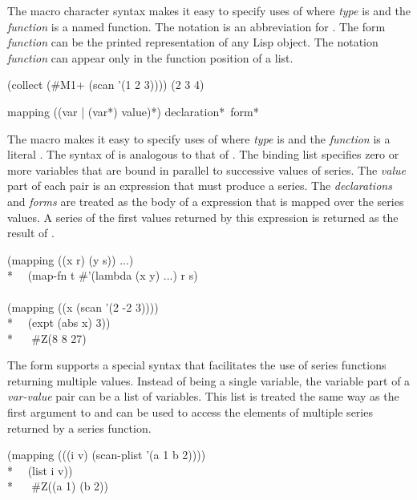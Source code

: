 \begin{defun}[Function]
The \cd{\#} macro character syntax  makes it easy to specify uses of 
where \emph{type} is  and the \emph{function} is a named
function.  The notation  is an
abbreviation for .  The form \emph{function} can
be the printed representation of any Lisp object.  The notation
\emph{function} can appear only in the
function position of a list.
\begin{lisp}
(collect (\#M1+ (scan '(1 2 3)))) {\EV} (2 3 4)
\end{lisp}
\end{defun}

\begin{defmac}
mapping ({({var | ({var}*)} value)}*) {declaration}* {\,form}*

The macro  makes it easy to specify uses of 
where \emph{type} is  and the \emph{function} is a literal 
.  The syntax of  is analogous to that of .
The binding list specifies zero or more variables that are bound in parallel to
successive values of series.  The \emph{value} part of each pair is
an expression that must produce a
series.  The \emph{declarations} and \emph{forms} are
treated as the body of a  expression
that is mapped over the series values.  A series of the first values
returned by this  expression is returned as the result of 
.
\begin{lisp}
(mapping ((x r) (y s)) ...) {\EQ} \\*
~~(map-fn t \#'(lambda (x y) ...) r s) \\
\\
(mapping ((x (scan '(2 -2 3)))) \\*
~~(expt (abs x) 3)) \\*
~~{\EV} \#Z(8 8 27)
\end{lisp}

The form  supports a special syntax that facilitates the
use of series functions returning multiple values.  Instead of being
a single variable, the variable part of a \emph{var-value} pair can be a list of
variables.  This list is treated the same way as the first argument to
 and can be used to access the elements of
multiple series returned by a series function.
\begin{lisp}
(mapping (((i v) (scan-plist '(a 1 b 2)))) \\*
~~(list i v)) \\*
~~{\EV} \#Z((a 1) (b 2))
\end{lisp}
\end{defmac}

